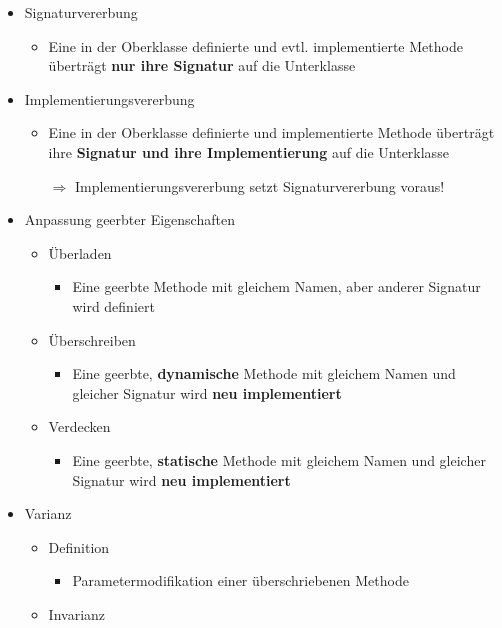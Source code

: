 \documentclass[parskip=full, 12pt]{scrartcl}
\begin{document}
			\begin{itemize}
				\item Signaturvererbung
				\begin{itemize}
					\item Eine in der Oberklasse definierte und evtl. implementierte Methode überträgt \textbf{nur ihre Signatur} auf die Unterklasse
				\end{itemize}
				\item Implementierungsvererbung
				\begin{itemize}
					\item Eine in der Oberklasse definierte und implementierte Methode überträgt ihre \textbf{Signatur und ihre Implementierung} auf die Unterklasse
					
					$\Rightarrow$ Implementierungsvererbung setzt Signaturvererbung voraus!
				\end{itemize}
				\item Anpassung geerbter Eigenschaften
				\begin{itemize}
					\item Überladen
					\begin{itemize}
						\item Eine geerbte Methode mit gleichem Namen, aber anderer Signatur wird definiert
					\end{itemize}
					\item Überschreiben
					\begin{itemize}
						\item Eine geerbte, \textbf{dynamische} Methode mit gleichem Namen und gleicher Signatur wird \textbf{neu implementiert}
					\end{itemize}
					\item Verdecken
					\begin{itemize}
						\item Eine geerbte, \textbf{statische} Methode mit gleichem Namen und gleicher Signatur wird \textbf{neu implementiert}
					\end{itemize}
				\end{itemize}
				\newpage
				\item Varianz
				\begin{itemize}
					\item Definition
					\begin{itemize}
						\item Parametermodifikation einer überschriebenen Methode
					\end{itemize}
					\item Invarianz

\end{itemize}
\end{itemize}
\end{document}
